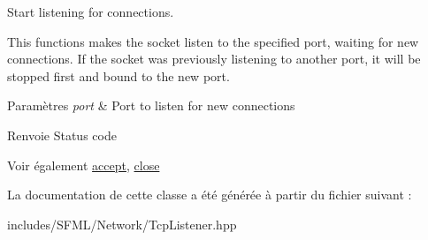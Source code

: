 Start listening for connections. 

This functions makes the socket listen to the specified port, waiting for new connections. If the socket was previously listening to another port, it will be stopped first and bound to the new port.


\begin{DoxyParams}{Paramètres}
{\em port} & Port to listen for new connections\\
\hline
\end{DoxyParams}
\begin{DoxyReturn}{Renvoie}
Status code
\end{DoxyReturn}
\begin{DoxySeeAlso}{Voir également}
\hyperlink{classsf_1_1TcpListener_ae2c83ce5a64d50b68180c46bef0a7346}{accept}, \hyperlink{classsf_1_1TcpListener_a3a00a850506bd0f9f48867a0fe59556b}{close} 
\end{DoxySeeAlso}


La documentation de cette classe a été générée à partir du fichier suivant \+:\begin{DoxyCompactItemize}
\item 
includes/\+S\+F\+M\+L/\+Network/Tcp\+Listener.\+hpp\end{DoxyCompactItemize}
